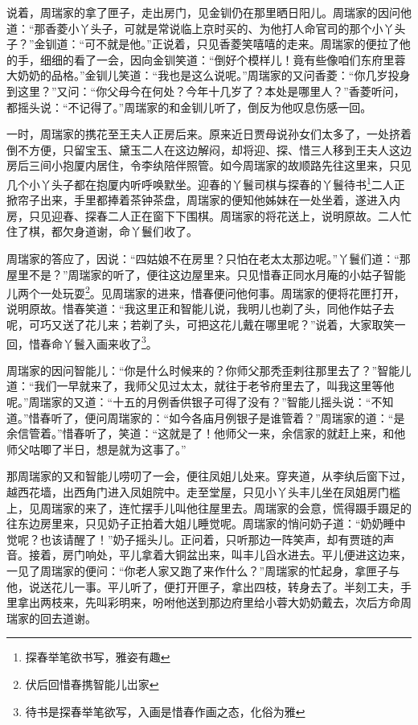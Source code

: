\documentclass[12pt,oneside]{book}
\begin{document}
说着，周瑞家的拿了匣子，走出房门，见金钏仍在那里晒日阳儿。周瑞家的因问他道：“那香菱小丫头子，可就是常说临上京时买的、为他打人命官司的那个小丫头子？”金钏道：“可不就是他。”正说着，只见香菱笑嘻嘻的走来。周瑞家的便拉了他的手，细细的看了一会，因向金钏笑道：“倒好个模样儿！竟有些像咱们东府里蓉大奶奶的品格。”金钏儿笑道：“我也是这么说呢。”周瑞家的又问香菱：“你几岁投身到这里？”又问：“你父母今在何处？今年十几岁了？本处是哪里人？”香菱听问，都摇头说：“不记得了。”周瑞家的和金钏儿听了，倒反为他叹息伤感一回。

一时，周瑞家的携花至王夫人正房后来。原来近日贾母说孙女们太多了，一处挤着倒不方便，只留宝玉、黛玉二人在这边解闷，却将迎、探、惜三人移到王夫人这边房后三间小抱厦内居住，令李纨陪伴照管。如今周瑞家的故顺路先往这里来，只见几个小丫头子都在抱厦内听呼唤默坐。迎春的丫鬟司棋与探春的丫鬟待书\footnote{探春举笔欲书写，雅姿有趣}二人正掀帘子出来，手里都捧着茶钟茶盘，周瑞家的便知他姊妹在一处坐着，遂进入内房，只见迎春、探春二人正在窗下下围棋。周瑞家的将花送上，说明原故。二人忙住了棋，都欠身道谢，命丫鬟们收了。

周瑞家的答应了，因说：“四姑娘不在房里？只怕在老太太那边呢。”丫鬟们道：“那屋里不是？”周瑞家的听了，便往这边屋里来。只见惜春正同水月庵的小姑子智能儿两个一处玩耍\footnote{伏后回惜春携智能儿岀家}。见周瑞家的进来，惜春便问他何事。周瑞家的便将花匣打开，说明原故。惜春笑道：“我这里正和智能儿说，我明儿也剃了头，同他作姑子去呢，可巧又送了花儿来；若剃了头，可把这花儿戴在哪里呢？”说着，大家取笑一回，惜春命丫鬟入画来收了\footnote{待书是探春举笔欲写，入画是惜春作画之态，化俗为雅}。

周瑞家的因问智能儿：“你是什么时候来的？你师父那秃歪剌往那里去了？”智能儿道：“我们一早就来了，我师父见过太太，就往于老爷府里去了，叫我这里等他呢。”周瑞家的又道：“十五的月例香供银子可得了没有？”智能儿摇头说：“不知道。”惜春听了，便问周瑞家的：“如今各庙月例银子是谁管着？”周瑞家的道：“是余信管着。”惜春听了，笑道：“这就是了！他师父一来，余信家的就赶上来，和他师父咕唧了半日，想是就为这事了。”

那周瑞家的又和智能儿唠叨了一会，便往凤姐儿处来。穿夹道，从李纨后窗下过，越西花墙，出西角门进入凤姐院中。走至堂屋，只见小丫头丰儿坐在凤姐房门槛上，见周瑞家的来了，连忙摆手儿叫他往屋里去。周瑞家的会意，慌得蹑手蹑足的往东边房里来，只见奶子正拍着大姐儿睡觉呢。周瑞家的悄问奶子道：“奶奶睡中觉呢？也该请醒了！”奶子摇头儿。正问着，只听那边一阵笑声，却有贾琏的声音。接着，房门响处，平儿拿着大铜盆出来，叫丰儿舀水进去。平儿便进这边来，一见了周瑞家的便问：“你老人家又跑了来作什么？”周瑞家的忙起身，拿匣子与他，说送花儿一事。平儿听了，便打开匣子，拿出四枝，转身去了。半刻工夫，手里拿出两枝来，先叫彩明来，吩咐他送到那边府里给小蓉大奶奶戴去，次后方命周瑞家的回去道谢。
\end{document}
